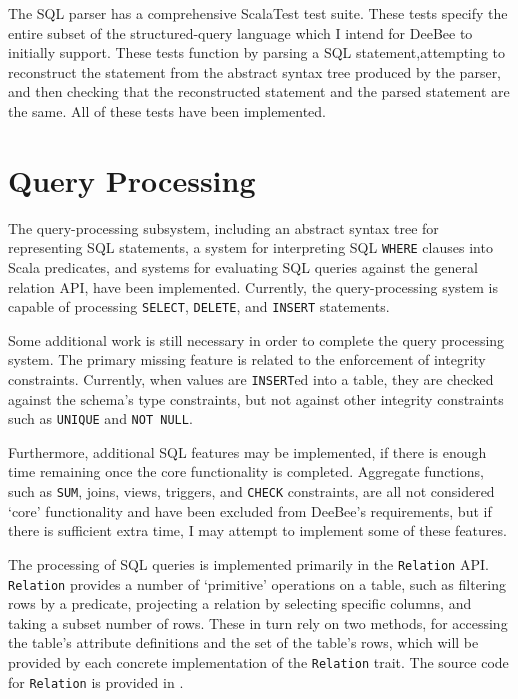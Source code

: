 The SQL parser has a comprehensive ScalaTest test suite. These tests specify the entire subset of the structured-query language which I intend for DeeBee to initially support. These tests function by parsing a SQL statement,attempting to reconstruct the statement from the abstract syntax tree produced by the parser, and then checking that the reconstructed statement and the parsed statement are the same. All of these tests have been implemented.

\section{Query Processing}

The query-processing subsystem, including an abstract syntax tree for representing SQL statements, a system for interpreting SQL \texttt{WHERE} clauses into Scala predicates, and systems for evaluating SQL queries against the general relation API, have been implemented. Currently, the query-processing system is capable of processing \texttt{SELECT}, \texttt{DELETE}, and \texttt{INSERT} statements.

Some additional work is still necessary in order to complete the query processing system. The primary missing feature is related to the enforcement of integrity constraints. Currently, when values are \texttt{INSERT}ed into a table, they are checked against the schema's type constraints, but not against other integrity constraints such as \texttt{UNIQUE} and \texttt{NOT NULL}.

Furthermore, additional SQL features may be implemented, if there is enough time remaining once the core functionality is completed. Aggregate functions, such as \texttt{SUM}, joins, views, triggers, and \texttt{CHECK} constraints, are all not considered `core' functionality and have been excluded from DeeBee's requirements, but if there is sufficient extra time, I may attempt to implement some of these features. 

The processing of SQL queries is implemented primarily in the \texttt{Relation} API. \texttt{Relation} provides a number of `primitive' operations on a table, such as filtering rows by a predicate, projecting a relation by selecting specific columns, and taking a subset number of rows. These in turn rely on two methods, for accessing the table's attribute definitions and the set of the table's rows, which will be provided by each concrete implementation of the \texttt{Relation} trait. The source code for \texttt{Relation} is provided in .


